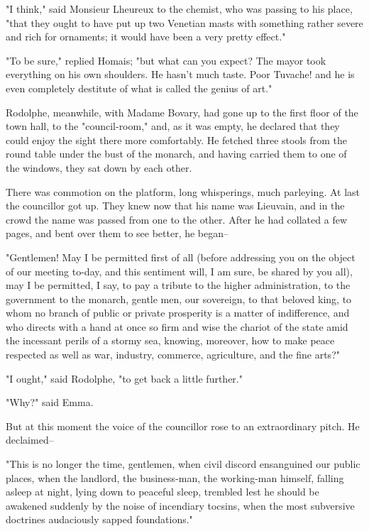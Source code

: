 \documentclass{tufte-book}
\begin{document}
"I think," said Monsieur Lheureux to the chemist, who was passing to his
place, "that they ought to have put up two Venetian masts with something
rather severe and rich for ornaments; it would have been a very pretty
effect."

"To be sure," replied Homais; "but what can you expect? The mayor took
everything on his own shoulders. He hasn't much taste. Poor Tuvache! and
he is even completely destitute of what is called the genius of art."

Rodolphe, meanwhile, with Madame Bovary, had gone up to the first
floor of the town hall, to the "council-room," and, as it was empty,
he declared that they could enjoy the sight there more comfortably. He
fetched three stools from the round table under the bust of the monarch,
and having carried them to one of the windows, they sat down by each
other.

There was commotion on the platform, long whisperings, much parleying.
At last the councillor got up. They knew now that his name was Lieuvain,
and in the crowd the name was passed from one to the other. After he had
collated a few pages, and bent over them to see better, he began--

"Gentlemen! May I be permitted first of all (before addressing you on
the object of our meeting to-day, and this sentiment will, I am sure, be
shared by you all), may I be permitted, I say, to pay a tribute to the
higher administration, to the government to the monarch, gentle men, our
sovereign, to that beloved king, to whom no branch of public or private
prosperity is a matter of indifference, and who directs with a hand at
once so firm and wise the chariot of the state amid the incessant perils
of a stormy sea, knowing, moreover, how to make peace respected as well
as war, industry, commerce, agriculture, and the fine arts?"

"I ought," said Rodolphe, "to get back a little further."

"Why?" said Emma.

But at this moment the voice of the councillor rose to an extraordinary
pitch. He declaimed--

"This is no longer the time, gentlemen, when civil discord ensanguined
our public places, when the landlord, the business-man, the working-man
himself, falling asleep at night, lying down to peaceful sleep, trembled
lest he should be awakened suddenly by the noise of incendiary tocsins,
when the most subversive doctrines audaciously sapped foundations."
\end{document}
